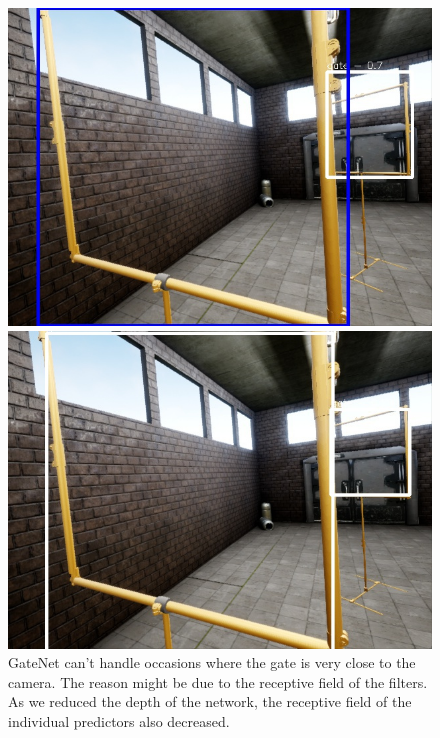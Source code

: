 \documentclass{article}
\begin{document}
\begin{figure}[h]
		\begin{minipage}{0.3\linewidth}
		\includegraphics[width=\linewidth]{fig/gate_comp3}
	\end{minipage}
	\begin{minipage}{0.3\linewidth}
		\includegraphics[width=\linewidth]{fig/v2_comp3}
	\end{minipage}
	\caption{GateNet can't handle occasions where the gate is very close to the camera. The reason might be due to the receptive field of the filters. As we reduced the depth of the network, the receptive field of the individual predictors also decreased.}
	

\end{figure}
\end{document}
